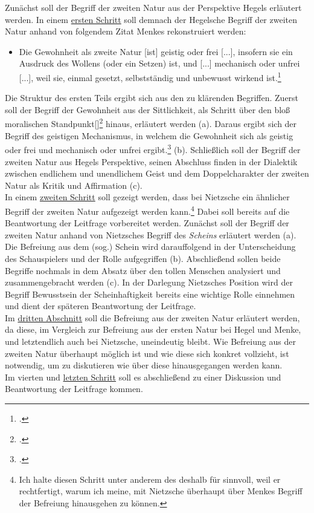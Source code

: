 \documentclass[12pt, a4paper, openany]{report}
\begin{document}
Zunächst soll der Begriff der zweiten Natur aus der Perspektive Hegels erläutert werden. 
In einem \hyperref[abschnitt_1]{ersten Schritt} soll demnach der Hegelsche Begriff der zweiten Natur anhand von folgendem Zitat Menkes rekonstruiert werden:
\begin{itemize}
    \item[] Die Gewohnheit als zweite Natur [ist] geistig oder frei [...], insofern sie ein Ausdruck des Wollens (oder ein Setzen) ist, und [...] mechanisch oder unfrei [...], weil sie, einmal gesetzt, selbstständig und unbewusst wirkend ist.\footcite[][145]{menke_autonomie_2018}
\end{itemize}
Die Struktur des ersten Teils ergibt sich aus den zu klärenden Begriffen. 
Zuerst soll der Begriff der Gewohnheit aus der Sittlichkeit, als Schritt über den \glqq bloß moralischen Standpunkt[]\grqq\footcite[][§ 135, S.139]{hegel_grundlinien_2017} hinaus, erläutert werden (a). 
Daraus ergibt sich der Begriff des \glqq geistigen Mechanismus\grqq, in welchem die Gewohnheit sich als \glqq geistig oder frei\grqq{} und \glqq mechanisch oder unfrei\grqq{} ergibt.\footcite[][145]{menke_autonomie_2018} (b).
Schließlich soll der Begriff der zweiten Natur aus Hegels Perspektive, seinen Abschluss finden in der Dialektik zwischen endlichem und unendlichem Geist und dem Doppelcharakter der zweiten Natur als Kritik und Affirmation (c).\\
In einem \hyperref[abschnitt_2]{zweiten Schritt} soll gezeigt werden, dass bei Nietzsche ein ähnlicher Begriff der zweiten Natur aufgezeigt werden kann.\footnote{Ich halte diesen Schritt unter anderem des deshalb für sinnvoll, weil er rechtfertigt, warum ich meine, mit Nietzsche überhaupt über Menkes Begriff der Befreiung hinausgehen zu können.}
Dabei soll bereits auf die Beantwortung der Leitfrage vorbereitet werden.
Zunächst soll der Begriff der zweiten Natur anhand von Nietzsches Begriff des \textit{Scheins} erläutert werden (a).
Die Befreiung aus dem (sog.) Schein wird darauffolgend in der Unterscheidung des Schauspielers und der Rolle aufgegriffen (b). 
Abschließend sollen beide Begriffe nochmals in dem Absatz über den tollen Menschen analysiert und zusammengebracht werden (c).
In der Darlegung Nietzsches Position wird der Begriff \glqq Bewusstsein der Scheinhaftigkeit\grqq{} bereits eine wichtige Rolle einnehmen und dient der späteren Beantwortung der Leitfrage.\\
Im \hyperref[abschnitt_3]{dritten Abschnitt} soll die Befreiung aus der zweiten Natur erläutert werden, da diese, im Vergleich zur Befreiung aus der ersten Natur bei Hegel und Menke, und letztendlich auch bei Nietzsche, uneindeutig bleibt.
Wie Befreiung aus der zweiten Natur überhaupt möglich ist und wie diese sich konkret vollzieht, ist notwendig, um zu diskutieren wie über diese hinausgegangen werden kann.\\
Im vierten und \hyperref[abschnitt_4]{letzten Schritt} soll es abschließend zu einer Diskussion und Beantwortung der Leitfrage kommen. 
\end{document}

